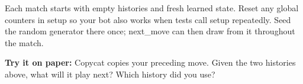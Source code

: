 Each match starts with empty histories and fresh learned state. Reset any global counters in setup so your bot also works when tests call setup repeatedly. Seed the random generator there once; next\_move can then draw from it throughout the match.


\begin{checkpoint}
\textbf{Try it on paper:} Copycat copies your preceding move. Given the two histories above, what will it play next? Which history did you use?
\end{checkpoint}
